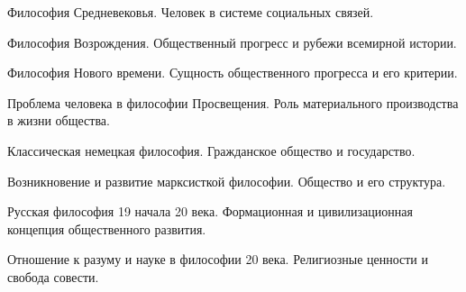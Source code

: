 \documentclass[
	14pt,
	a4paper,
	]
	{scrartcl}
\begin{document}
\vfill
\z 	Философия Средневековья.
 \vfill
\z 	Человек в системе социальных связей.
 \vfill

\vfill

\newpage


\shapk
{}
\setcounter{zad}{0}

\vfill
\z 	Философия Возрождения.
 \vfill
\z 	Общественный прогресс и рубежи всемирной истории.
 \vfill

\vfill

\newpage


\shapk
{}
\setcounter{zad}{0}

\vfill
\z 	Философия Нового времени.
 \vfill
\z 	Сущность общественного прогресса и его критерии.
 \vfill

\vfill

\newpage


\shapk
{}
\setcounter{zad}{0}

\vfill
\z 	Проблема человека в философии Просвещения.
 \vfill
\z 	Роль материального производства в жизни общества.
 \vfill

\vfill

\newpage


\shapk
{}
\setcounter{zad}{0}

\vfill
\z 	Классическая немецкая философия.
 \vfill
\z 	Гражданское общество и государство.
 \vfill

\vfill

\newpage


\shapk
{}
\setcounter{zad}{0}

\vfill
\z 	Возникновение и развитие марксисткой философии.
 \vfill
\z 	Общество и его структура.
 \vfill

\vfill

\newpage


\shapk
{}
\setcounter{zad}{0}

\vfill
\z 	Русская философия 19 начала 20 века.
 \vfill
\z 	Формационная и цивилизационная концепция общественного развития.
 \vfill

\vfill

\newpage


\shapk
{}
\setcounter{zad}{0}

\vfill
\z 	Отношение к разуму и науке в философии 20 века.
 \vfill
\z 	Религиозные ценности и свобода совести.
 \vfill

\vfill
\end{document}
